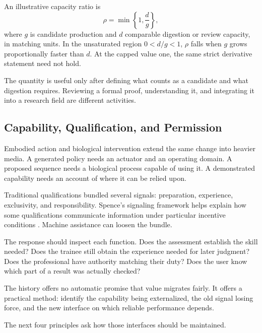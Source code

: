 An illustrative capacity ratio is
\begin{equation}
 \rho=\min\left\{1,\frac{d}{g}\right\},
\end{equation}
where $g$ is candidate production and $d$ comparable digestion or review capacity, in matching units. In the unsaturated region $0<d/g<1$, $\rho$ falls when $g$ grows proportionally faster than $d$. At the capped value one, the same strict derivative statement need not hold.

The quantity is useful only after defining what counts as a candidate and what digestion requires. Reviewing a formal proof, understanding it, and integrating it into a research field are different activities.

\subsection{Capability, Qualification, and Permission}

Embodied action and biological intervention extend the same change into heavier media. A generated policy needs an actuator and an operating domain. A proposed sequence needs a biological process capable of using it. A demonstrated capability needs an account of where it can be relied upon.

Traditional qualifications bundled several signals: preparation, experience, exclusivity, and responsibility. Spence's signaling framework helps explain how some qualifications communicate information under particular incentive conditions \cite{spence1973job}. Machine assistance can loosen the bundle.

The response should inspect each function. Does the assessment establish the skill needed? Does the trainee still obtain the experience needed for later judgment? Does the professional have authority matching their duty? Does the user know which part of a result was actually checked?

The history offers no automatic promise that value migrates fairly. It offers a practical method: identify the capability being externalized, the old signal losing force, and the new interface on which reliable performance depends.

The next four principles ask how those interfaces should be maintained.
